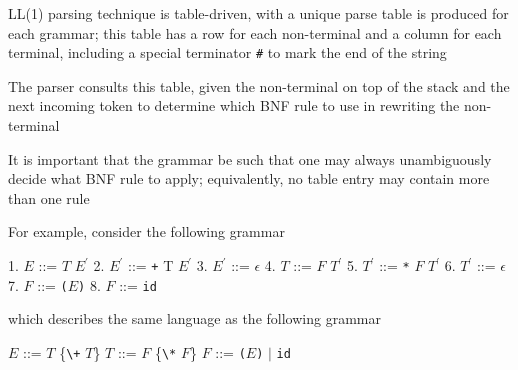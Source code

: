 \documentclass[8pt,a4paper,compress,handout]{beamer}
\newcommand{\mm}[1]{$#1$}
\newcommand{\expo}[2]{$#1^{#2}$}
\newenvironment{spaced}
{
\smallskip
\hspace{.5cm}
\begin{minipage}[c]{\textwidth}
}
{
\end{minipage}
\smallskip
}
\begin{document}
\begin{frame}[fragile]
\pause

LL(1) parsing technique is table-driven, with a unique parse table is produced for each grammar; this table has a row for each non-terminal and a column for each terminal, including a special terminator \lstinline{#} to mark the end of the string

\pause
\bigskip

The parser consults this table, given the non-terminal on top of the stack and the next incoming token to determine which BNF rule to use in rewriting the non-terminal

\pause
\bigskip

It is important that the grammar be such that one may always unambiguously decide what BNF rule to apply; equivalently, no table entry may contain more than one rule

\pause
\bigskip

For example, consider the following grammar

\text{ }
\begin{spaced}
\begin{production}
1. \mm{E}  ::= \mm{T} \expo{E}{\prime}
2. \expo{E}{\prime} ::= \lstinline{+} T \expo{E}{\prime}
3. \expo{E}{\prime} ::= \mm{\epsilon}
4. \mm{T}  ::= \mm{F} \expo{T}{\prime}
5. \expo{T}{\prime} ::= \lstinline{*} \mm{F} \expo{T}{\prime}
6. \expo{T}{\prime} ::= \mm{\epsilon}
7. \mm{F}  ::= \lstinline{(}\mm{E}\lstinline{)}
8. \mm{F}  ::= \lstinline{id}
\end{production}
\end{spaced}

which describes the same language as the following grammar

\text{ }
\begin{spaced}
\begin{production}
\mm{E} ::= \mm{T} \{\lstinline{\+} \mm{T}\}
\mm{T} ::= \mm{F} \{\lstinline{\*} \mm{F}\}
\mm{F} ::= \lstinline{(}\mm{E}\lstinline{)} \mm{|} \lstinline{id}
\end{production}
\end{spaced}
\end{frame}
\end{document}
